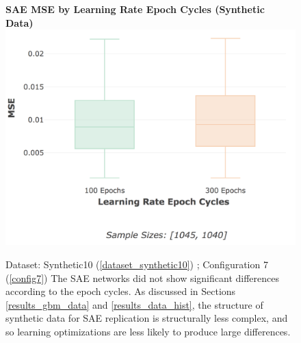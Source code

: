 \documentclass[a4paper,11pt,oneside]{article}
\theoremstyle{plain}
\theoremstyle{definition}
\begin{document}
		\begin{figure}[H]
		\centering 
		\textbf{SAE MSE by Learning Rate Epoch Cycles (Synthetic Data)}
		\includegraphics[scale=0.3]{images/results/8_appendix/synth_mse_lr_epochs.png} 
		\caption[SAE MSE by Learning Rate Epoch Cycles (Synthetic Data)]{Dataset: Synthetic10 (\ref{dataset_synthetic10}) ; Configuration 7 (\ref{config7})
			\newline The SAE networks did not show significant differences according to the epoch cycles. As discussed in Sections \ref{results_gbm_data} and \ref{results_data_hist}, the structure of synthetic data for SAE replication is structurally less complex, and so learning optimizations are less likely to produce large differences.}
		\label{figure-synth_mse_lr_epochs}
		\end{figure}
	
\end{document}
